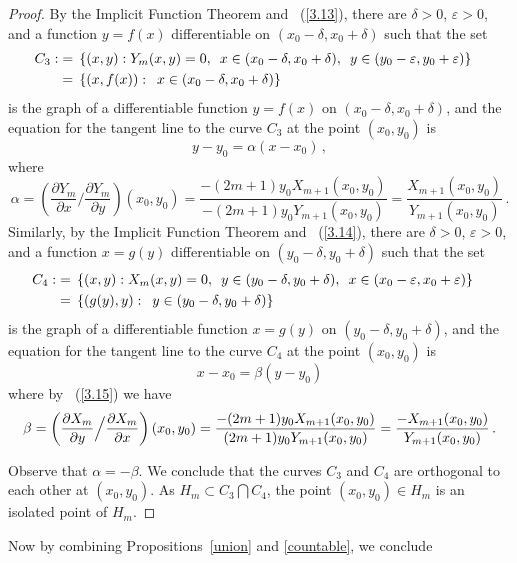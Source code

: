 \documentclass{article}
\theoremstyle{remark}
\numberwithin{equation}{section}
\begin{document}
\begin{proof}
By the Implicit Function Theorem and ~(\ref{3.13}), there are $\delta > 0$, $\varepsilon > 0$, and a function $y = f(x)$
differentiable on $(x_0-\delta,x_0+\delta)$ such that the set
\begin{equation} \notag \begin{split} C_3 : & = \,  \{(x,y): Y_m(x,y) = 0, \enskip x \in (x_0-\delta,x_0+\delta), \enskip y \in (y_0-\varepsilon,y_0+\varepsilon)\} \cr
& = \, \{(x,f(x)): \enskip x \in (x_0-\delta,x_0+\delta)\} \cr \end{split}
\end{equation}
is the graph of a differentiable function $y = f(x)$ on $(x_0-\delta,x_0+\delta)$, and the equation for the tangent line to the curve $C_3$ at the point $(x_0,y_0)$ is
$$y-y_0 = \alpha(x-x_0)\,,$$
where
$$ \alpha = \left( \frac{\partial{Y_m}}{\partial x} \Big / \frac{\partial{Y_m}}{{\partial y}} \right)(x_0,y_0)
= \frac{-(2m+1)y_0X_{m+1}(x_0,y_0)}{-(2m+1)y_0Y_{m+1}(x_0,y_0)} = \frac{X_{m+1}(x_0,y_0)}{Y_{m+1}(x_0,y_0)}\,.$$
Similarly, by the Implicit Function Theorem and ~(\ref{3.14}), there are $\delta > 0$, $\varepsilon > 0$, and a function $x = g(y)$ differentiable on
$(y_0-\delta,y_0+\delta)$ such that the set
\begin{equation} \notag \begin{split} C_4 : & = \, \{(x,y): X_m(x,y) = 0, \enskip y \in (y_0-\delta,y_0+\delta), \enskip x \in (x_0-\varepsilon,x_0+\varepsilon)\} \cr
& = \, \{(g(y),y): \enskip y \in (y_0-\delta,y_0+\delta)\} \cr \end{split}
\end{equation}
is the graph of a differentiable function $x = g(y)$ on $(y_0-\delta,y_0+\delta)$, and the equation for the tangent line to the curve $C_4$ at the point $(x_0,y_0)$ is
$$x-x_0 = \beta(y-y_0)$$
where by ~(\ref{3.15}) we have
\begin{equation} \notag \beta = \left( \frac{\partial{X_m}}{\partial y} \Big / \frac{\partial{X_m}}{{\partial x}} \right)(x_0,y_0)
= \frac{-(2m+1)y_0X_{m+1}(x_0,y_0)}{(2m+1)y_0Y_{m+1}(x_0,y_0)} = \frac{-X_{m+1}(x_0,y_0)}{Y_{m+1}(x_0,y_0)}\,.
\end{equation}

Observe that $\alpha = -\beta$. We conclude that the curves $C_3$ and $C_4$ are orthogonal to each other at $(x_0,y_0)$. As $H_m \subset C_3 \bigcap C_4$,
the point $(x_0,y_0) \in H_m$ is an isolated point of $H_m$.
\end{proof}

Now by combining Propositions~\ref{union} and \ref{countable}, we conclude
\end{document}
